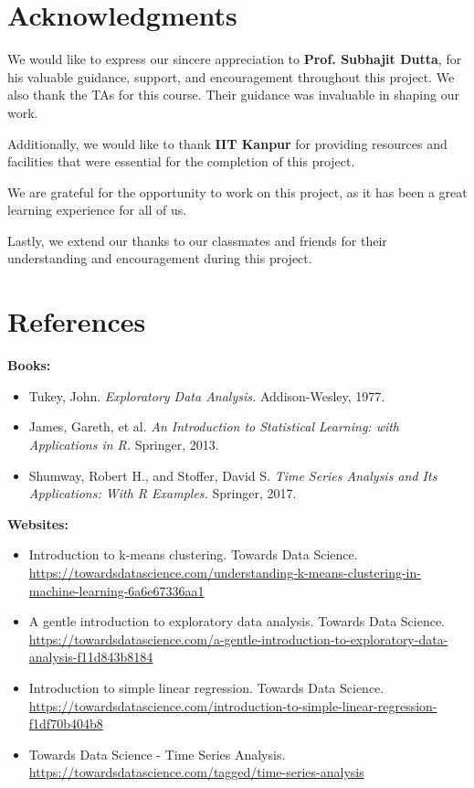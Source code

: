 \documentclass{article}
\begin{document}
\newpage
\section{Acknowledgments}

We would like to express our sincere appreciation to \textbf{Prof. Subhajit Dutta}, for his valuable guidance, support, and encouragement throughout this project. We also thank the TAs for this course. Their guidance was invaluable in shaping our work.

Additionally, we would like to thank \textbf{IIT Kanpur} for providing resources and facilities that were essential for the completion of this project.

We are grateful for the opportunity to work on this project, as it has been a great learning experience for all of us.

Lastly, we extend our thanks to our classmates and friends for their understanding and encouragement during this project.
\newpage
\section{References}


\textbf{Books:}

\begin{itemize}
    
    \item Tukey, John. \textit{Exploratory Data Analysis.} Addison-Wesley, 1977.
    
    \item James, Gareth, et al. \textit{An Introduction to Statistical Learning: with Applications in R.} Springer, 2013.

    \item Shumway, Robert H., and Stoffer, David S. \textit{Time Series Analysis and Its Applications: With R Examples.} Springer, 2017.

    
\end{itemize}

\textbf{Websites:}

\begin{itemize}

    \item Introduction to k-means clustering. Towards Data Science. \url{https://towardsdatascience.com/understanding-k-means-clustering-in-machine-learning-6a6e67336aa1}
    
    \item A gentle introduction to exploratory data analysis. Towards Data Science. \url{https://towardsdatascience.com/a-gentle-introduction-to-exploratory-data-analysis-f11d843b8184}
    
    \item Introduction to simple linear regression. Towards Data Science. \url{https://towardsdatascience.com/introduction-to-simple-linear-regression-f1df70b404b8}

    \item Towards Data Science - Time Series Analysis. \url{https://towardsdatascience.com/tagged/time-series-analysis}
    
   
\end{itemize}
\end{document}
